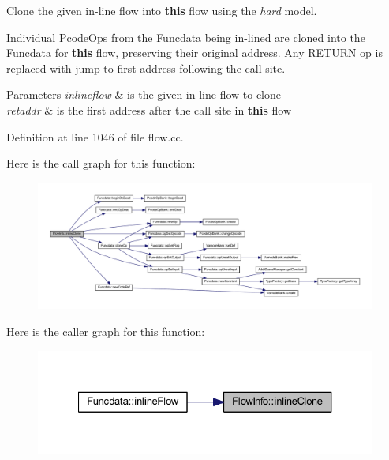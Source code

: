 Clone the given in-\/line flow into {\bfseries{this}} flow using the {\itshape hard} model. 

Individual Pcode\+Ops from the \mbox{\hyperlink{class_funcdata}{Funcdata}} being in-\/lined are cloned into the \mbox{\hyperlink{class_funcdata}{Funcdata}} for {\bfseries{this}} flow, preserving their original address. Any R\+E\+T\+U\+RN op is replaced with jump to first address following the call site. 
\begin{DoxyParams}{Parameters}
{\em inlineflow} & is the given in-\/line flow to clone \\
\hline
{\em retaddr} & is the first address after the call site in {\bfseries{this}} flow \\
\hline
\end{DoxyParams}


Definition at line 1046 of file flow.\+cc.

Here is the call graph for this function\+:
\nopagebreak
\begin{figure}[H]
\begin{center}
\leavevmode
\includegraphics[width=350pt]{class_flow_info_acb0b9cbb6144cd2963c63072d6d72882_cgraph}
\end{center}
\end{figure}
Here is the caller graph for this function\+:
\nopagebreak
\begin{figure}[H]
\begin{center}
\leavevmode
\includegraphics[width=327pt]{class_flow_info_acb0b9cbb6144cd2963c63072d6d72882_icgraph}
\end{center}
\end{figure}
\mbox{\label{class_flow_info_a5819105426192965fb0a73831a785060}} 
